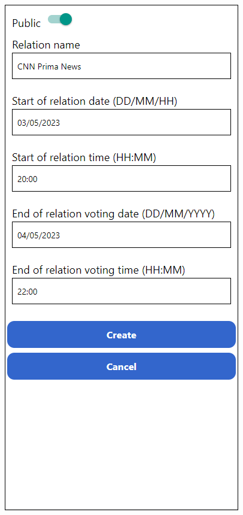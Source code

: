 \begin{figure}
\centering
\begin{minipage}{.5\textwidth}
  \centering
  \includegraphics[width=.9\linewidth]{obrazky/pridat_relaci.png}

\end{minipage}
\end{figure}
